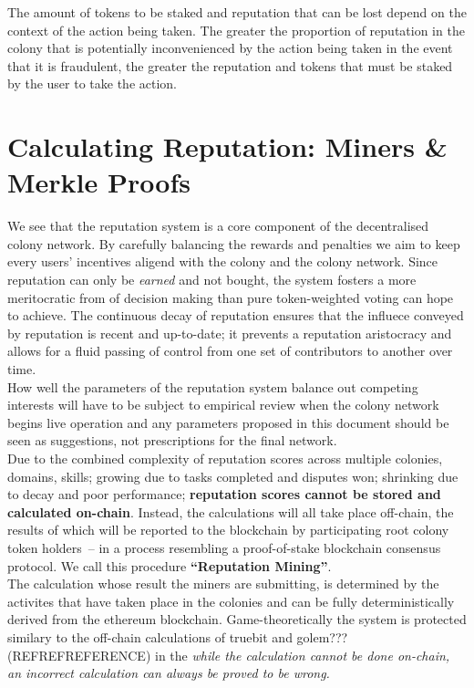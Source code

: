 The amount of tokens to be staked and reputation that can be lost depend on the context of the action being taken. The greater the proportion of reputation in the colony that is potentially inconvenienced by the action being taken in the event that it is fraudulent, the greater the reputation and tokens that must be staked by the user to take the action.




\newcommand{\rc}{root colony\ }
\newcommand{\rct}{root colony token\ }
\newcommand{\rcts}{root colony tokens\ }
\newcommand{\rcth}{root colony token holder\ }
\newcommand{\rcths}{root colony token holders\ }

\section{Calculating Reputation: Miners \& Merkle Proofs}\label{sec:reputationmining}
We see that the reputation system is a core component of the decentralised colony network. By carefully balancing the rewards and penalties we aim to keep every users' incentives aligend with the colony and the colony network. Since reputation can only be \emph{earned} and not bought, the system fosters a more meritocratic from of decision making than pure token-weighted voting can hope to achieve. The continuous decay of reputation ensures that the influece conveyed by reputation is recent and up-to-date; it prevents a reputation aristocracy and allows for a fluid passing of control from one set of contributors to another over time.\\
How well the parameters of the reputation system balance out competing interests will have to be subject to empirical review when the colony network begins live operation and any parameters proposed in this document should be seen as suggestions, not prescriptions for the final network.\\
Due to the combined complexity of reputation scores across multiple colonies, domains, skills; growing due to tasks completed and disputes won; shrinking due to decay and poor performance; \textbf{reputation scores cannot be stored and calculated on-chain}. Instead, the calculations will all take place off-chain, the results of which will be reported to the blockchain by participating \rcths -- in a process resembling a proof-of-stake blockchain consensus protocol. We call this procedure \textbf{``Reputation Mining''}.\\
The calculation whose result the miners are submitting, is determined by the activites that have taken place in the colonies and can be fully deterministically derived from the ethereum blockchain. Game-theoretically the system is protected similary to the off-chain calculations of truebit and golem??? (REFREFREFERENCE) in the \emph{while the calculation cannot be done on-chain, an incorrect calculation can always be proved to be wrong.}


